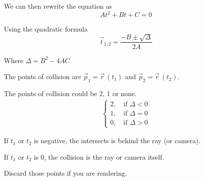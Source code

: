 \documentclass{article}
\begin{document}
We can then rewrite the equation as
\[
	At^2+Bt+C=0
\]

Using the quadratic formula
\[
	\vec{t}_{1,2}=\frac{-B\pm\sqrt{\Delta}}{2A}
\]

Where \(\Delta=B^2-4AC\)

The points of collision are \(\vec{p}_1=\vec{r}\,(t_1)\) and \(\vec{p}_2=\vec{r}\,(t_2)\).

The points of collision could be 2, 1 or none.
\begin{align*}
	\begin{cases}
		2,\quad\text{if }\Delta<0\\
		1,\quad\text{if }\Delta=0\\
		0,\quad\text{if }\Delta>0
	\end{cases}
\end{align*}

If \(t_1\) or \(t_2\) is negative, the intersects is behind the ray (or camera).

If \(t_1\) or \(t_2\) is \(0\), the collision is the ray or camera itself.

Discard those points if you are rendering.
\end{document}
